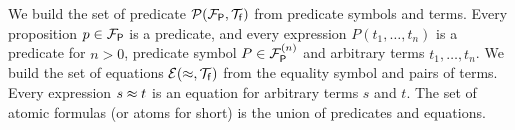 
\begin{definition}\label{def:predicates}
	We build the set of {\myem predicate} ${{\mathcal P}({{\mathcal F}_{\mathsf P}},{\mathcal T}_{\mathsf f}})$
	from predicate symbols and terms. 
	Every proposition $p\in {{\mathcal F}_{\mathsf P}}$ is a predicate, 
	and every expression $P(t_1,\ldots,t_n)$ is a predicate for $n>0$,
	predicate symbol $P\in{{\mathcal F}_{\mathsf P}^{(n)}}$ and arbitrary terms $t_1,\ldots,t_n$.
%	
	We build the set of {\myem equations }${{\mathcal E}(\approx, {\mathcal T}_{\mathsf f}})$ from the equality symbol and pairs of terms.
	Every expression $s\approx t$ is an equation for arbitrary terms $s$ and $t$.
%	
	The set of atomic formulas (or {\myem atoms }for short) is the union of predicates and equations.
\end{definition}